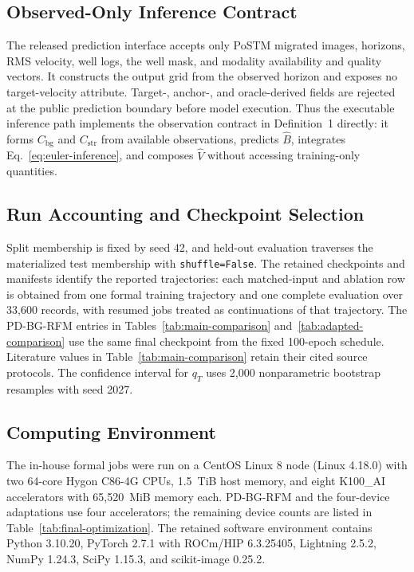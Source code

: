 \documentclass[letterpaper]{article}
\begin{document}
\subsection{Observed-Only Inference Contract}
The released prediction interface accepts only PoSTM migrated images, horizons, RMS velocity, well logs, the well mask, and modality availability and quality vectors. It constructs the output grid from the observed horizon and exposes no target-velocity attribute. Target-, anchor-, and oracle-derived fields are rejected at the public prediction boundary before model execution. Thus the executable inference path implements the observation contract in Definition~1 directly: it forms $C_{\mathrm{bg}}$ and $C_{\mathrm{str}}$ from available observations, predicts $\hat B$, integrates Eq.~\ref{eq:euler-inference}, and composes $\hat V$ without accessing training-only quantities.

\subsection{Run Accounting and Checkpoint Selection}
Split membership is fixed by seed 42, and held-out evaluation traverses the materialized test membership with \texttt{shuffle=False}. The retained checkpoints and manifests identify the reported trajectories: each matched-input and ablation row is obtained from one formal training trajectory and one complete evaluation over 33,600 records, with resumed jobs treated as continuations of that trajectory. The PD-BG-RFM entries in Tables~\ref{tab:main-comparison} and~\ref{tab:adapted-comparison} use the same final checkpoint from the fixed 100-epoch schedule. Literature values in Table~\ref{tab:main-comparison} retain their cited source protocols. The confidence interval for $q_T$ uses 2,000 nonparametric bootstrap resamples with seed 2027.

\subsection{Computing Environment}
The in-house formal jobs were run on a CentOS Linux 8 node (Linux 4.18.0) with two 64-core Hygon C86-4G CPUs, 1.5~TiB host memory, and eight K100\_AI accelerators with 65,520~MiB memory each. PD-BG-RFM and the four-device adaptations use four accelerators; the remaining device counts are listed in Table~\ref{tab:final-optimization}. The retained software environment contains Python 3.10.20, PyTorch 2.7.1 with ROCm/HIP 6.3.25405, Lightning 2.5.2, NumPy 1.24.3, SciPy 1.15.3, and scikit-image 0.25.2.
\end{document}
